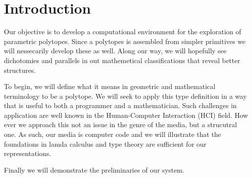 \chapter{Introduction}

Our objective is to develop a computational environment for the exploration
of parametric polytopes. Since a polytopes is assembled from simpler
primitives we will nessecarily develop these as well. Along our way, we
will hopefully see dichotomies and parallels in out mathemetical
classifications that reveal better structures.

To begin, we will define what it means in geometric and mathematical
terminology to be a polytope. We will seek to apply this type definition
in a way that is useful to both a programmer and a mathematician.
Such challenges in application are well known in
the Human-Computer Interaction (HCI) field. \cite{Tognazzini_1993}
How ever we approach this not an issue in the genre of the media,
but a strucutral one. As such, our media is computer code and we
will illustrate that the foundations in lamda calculus and
type theory are sufficient for our representations.

Finally we will demonstrate the preliminaries of our system. 


